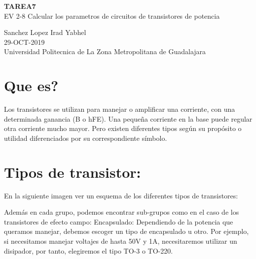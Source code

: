 \documentclass[11pt,a4paper]{article}
\begin{document}
\begin{center}
\textbf{TAREA7}\\ 
EV 2-8 Calcular los parametros de circuitos de transistores de potencia
\end{center}

\begin{center}
Sanchez Lopez Irad Yabhel\\
29-OCT-2019\\
Universidad Politecnica de La Zona Metropolitana de Guadalajara
\end{center}


\section{Que es?}
Los transistores se utilizan para manejar o amplificar una corriente, con una determinada ganancia (B o hFE).
Una pequeña corriente en la base puede regular otra corriente mucho mayor.
Pero existen diferentes tipos según su propósito o utilidad diferenciados por su correspondiente símbolo.
\section{Tipos de transistor:}
En la siguiente imagen ver un esquema de los diferentes tipos de transistores:

Además en cada grupo, podemos encontrar sub-grupos como en el caso de los transistores de efecto campo:
Encapsulado:
Dependiendo de la potencia que queramos manejar, debemos escoger un tipo de encapsulado u otro.
Por ejemplo, si necesitamos manejar voltajes de hasta 50V y 1A, necesitaremos utilizar un disipador, por tanto, elegiremos el tipo TO-3 o TO-220.
\end{document}
